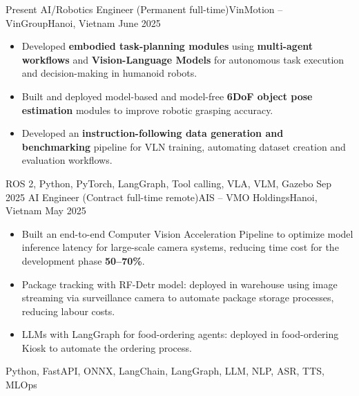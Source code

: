 %
%
%
\begin{experiences}
  \experience
    {Present}       {AI/Robotics Engineer (Permanent full-time)}{VinMotion -- VinGroup}{Hanoi, Vietnam}
    {June 2025}     {
                      \begin{itemize}
                        \item Developed \textbf{embodied task-planning modules} using \textbf{multi-agent workflows} and \textbf{Vision-Language Models} for autonomous task execution and decision-making in humanoid robots.
                        \item Built and deployed model-based and model-free \textbf{6DoF object pose estimation} modules to improve robotic grasping accuracy.
                        \item Developed an \textbf{instruction-following data generation and benchmarking} pipeline for VLN training, automating dataset creation and evaluation workflows.
                      \end{itemize}
                    }
                    {ROS 2, Python, PyTorch, LangGraph, Tool calling, VLA, VLM, Gazebo}
  \emptySeparator
  \experience
    {Sep 2025}      {AI Engineer (Contract full-time remote)}{AIS -- VMO Holdings}{Hanoi, Vietnam}
    {May 2025}      {
                      \begin{itemize}
                        \item Built an end-to-end Computer Vision Acceleration Pipeline to optimize model inference latency for large-scale camera systems, reducing time cost for the development phase \textbf{50--70\%}.
                        \item Package tracking with RF-Detr model: deployed in warehouse using image streaming via surveillance camera to automate package storage processes, reducing labour costs.
                        \item LLMs with LangGraph for food-ordering agents: deployed in food-ordering Kiosk to automate the ordering process.
                      \end{itemize}
                    }
                    {Python, FastAPI, ONNX, LangChain, LangGraph, LLM, NLP, ASR, TTS, MLOps}

\end{experiences}
